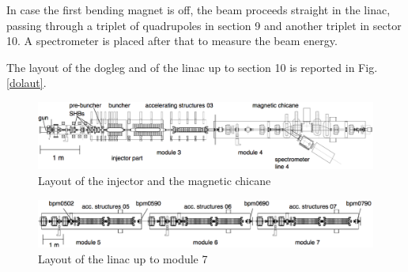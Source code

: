In case the first bending magnet is off, the beam proceeds straight in the linac, passing through a triplet of quadrupoles in section 9 and another triplet in sector 10. A spectrometer is placed after that to measure the beam energy. 

The layout of the dogleg and of the linac up to section 10 is reported in Fig. \ref{dolaut}.


\begin{landscape}
\begin{center}

\begin{figure}
\centering 
\includegraphics[width=23cm,keepaspectratio]{pictures/Injector}
\caption{Layout of the injector and the magnetic chicane}
\label{injlayout}
\end{figure}

\vspace{20mm}

\begin{figure}
\centering 
\includegraphics[width=23cm,keepaspectratio]{pictures/girder5-7}
\caption{Layout of the linac up to module 7}
\label{linaclayout}
\end{figure}

\end{center}
\end{landscape}



